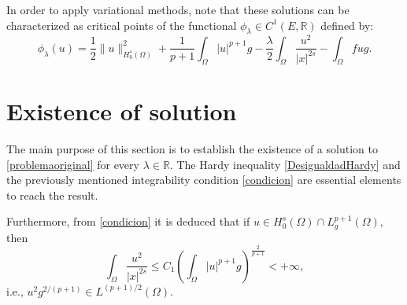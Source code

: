 \documentclass[preprint,12pt]{elsarticle}
\begin{document}
		In order to apply variational methods, note that these solutions can be characterized as critical points of the functional $\phi_{\lambda}\in C^1(E,\mathbb{R})$ defined by:
		\begin{equation*}
			\phi_{\lambda} (u)= \frac{1}{2}\|u\|^2_{H^s_0(\Omega)}+\frac{1}{p+1}\int_{\Omega}|u|^{p+1}g-\frac{\lambda}{2} \int_{\Omega}\frac{u^2}{|x|^{2s}}-\int_{\Omega}fug.
		\end{equation*}
		
		\section{Existence of solution}
		
		The main purpose of this section is to establish the existence of a solution to \eqref{problemaoriginal} for every $\lambda\in \mathbb{R}$. 
		The Hardy inequality \eqref{DesigualdadHardy} and the previously mentioned integrability condition \eqref{condicion} are essential elements to reach the result.
		
		Furthermore, from \eqref{condicion} it is deduced that if $u\in H^s_0(\Omega)\cap L^{p+1}_g(\Omega)$, then
		\begin{equation}\label{acotacion}
			\int_\Omega \frac{u^2}{|x|^{2s}} \leq C_1\left(\int_{\Omega}|u|^{p+1}g\right)^{\frac{2}{p+1}}<+\infty,
		\end{equation}
		i.e., $u^2g^{2/(p+1)}\in L^{(p+1)/2}(\Omega)$.
		
\end{document}
